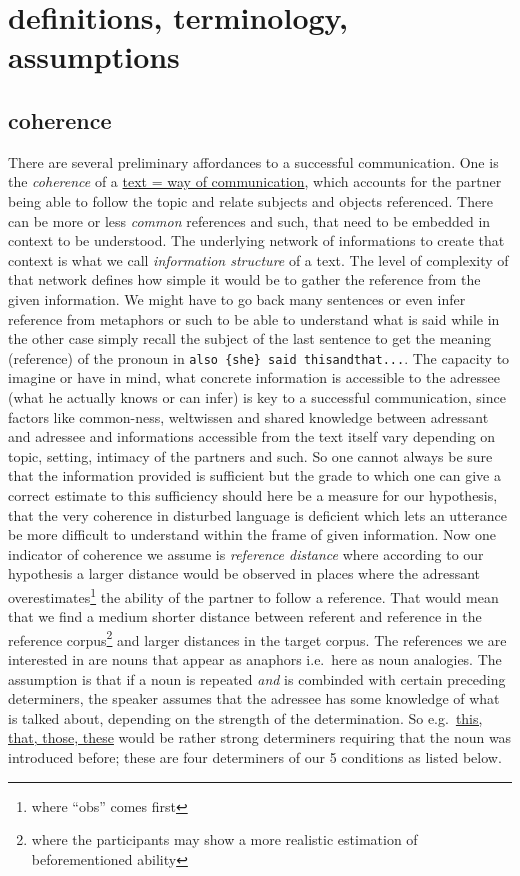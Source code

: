 \documentclass[
  12pt,
  oneside]{book}
\begin{document}
\section{definitions, terminology, assumptions}\label{definitions-terminology-assumptions}

\subsection{coherence}\label{coherence}

There are several preliminary affordances to a successful communication. One is the \emph{coherence} of a \href{}{text = way of communication}, which accounts for the partner being able to follow the topic and relate subjects and objects referenced. There can be more or less \emph{common} references and such, that need to be embedded in context to be understood. The underlying network of informations to create that context is what we call \emph{information structure} of a text. The level of complexity of that network defines how simple it would be to gather the reference from the given information. We might have to go back many sentences or even infer reference from metaphors or such to be able to understand what is said while in the other case simply recall the subject of the last sentence to get the meaning (reference) of the pronoun in \texttt{also\ \{she\}\ said\ thisandthat...}.
The capacity to imagine or have in mind, what concrete information is accessible to the adressee (what he actually knows or can infer) is key to a successful communication, since factors like common-ness, weltwissen and shared knowledge between adressant and adressee and informations accessible from the text itself vary depending on topic, setting, intimacy of the partners and such. So one cannot always be sure that the information provided is sufficient but the grade to which one can give a correct estimate to this sufficiency should here be a measure for our hypothesis, that the very coherence in disturbed language is deficient which lets an utterance be more difficult to understand within the frame of given information.
Now one indicator of coherence we assume is \emph{reference distance} where according to our hypothesis a larger distance would be observed in places where the adressant overestimates\footnote{where ``obs'' comes first} the ability of the partner to follow a reference. That would mean that we find a medium shorter distance between referent and reference in the reference corpus\footnote{where the participants may show a more realistic estimation of beforementioned ability} and larger distances in the target corpus. The references we are interested in are nouns that appear as anaphors i.e.~here as noun analogies. The assumption is that if a noun is repeated \emph{and} is combinded with certain preceding determiners, the speaker assumes that the adressee has some knowledge of what is talked about, depending on the strength of the determination. So e.g.~\href{}{this, that, those, these} would be rather strong determiners requiring that the noun was introduced before; these are four determiners of our 5 conditions as listed below.
\end{document}
